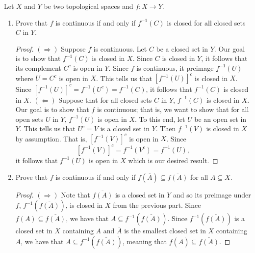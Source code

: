 \documentclass[a4paper]{article}
\begin{document}
\rhead{\thepage}
\begin{problem}
   Let \( X  \) and \( Y  \) be two topological spaces and \( f : X \to Y  \). 
   \begin{enumerate}
       \item[(i)] Prove that \( f  \) is continuous if and only if \( f^{-1}(C)  \) is closed for all closed sets \( C  \) in \( Y  \).
           \begin{proof}
               \( (\Longrightarrow) \) Suppose \( f  \) is continuous. Let \( C  \) be a closed set in \( Y  \). Our goal is to show that \( f^{-1}(C)  \) is closed in \( X  \). Since \( C  \) is closed in \( Y  \), it follows that its complement \( C^{c} \) is open in \( Y  \). Since \( f \) is continuous, it preimage \( f^{-1}(U) \) where \( U = C^{c} \) is open in \( X  \). This tells us that \( [f^{-1}(U)]^{c} \) is closed in \( X  \). Since \( [f^{-1}(U)]^{c} = f^{-1}(U^{c})  = f^{-1}(C) \), it follows that \( f^{-1}(C) \) is closed in \( X  \). 
\( (\Longleftarrow) \) Suppose that for all closed sets \( C  \) in \( Y  \), \( f^{-1}(C) \) is closed in \( X  \). Our goal is to show that \( f \) is continuous; that is, we want to show that for all open sets \( U  \) in \( Y  \), \( f^{-1}(U) \) is open in \( X  \). To this end, let \( U  \) be an open set in \( Y  \). This tells us that \( U^{c} = V  \) is a closed set in \( Y  \). Then \( f^{-1}(V) \) is closed in \( X  \) by assumption. That is, \( [f^{-1}(V)]^{c} \) is open in \( X  \). Since 
               \[  [f^{-1}(V)]^{c} = f^{-1}(V^{c}) = f^{-1}(U), \]
               it follows that \( f^{-1}(U) \) is open in \( X  \) which is our desired result.
           \end{proof}
       \item[(ii)] Prove that \( f  \) is continuous if and only if \( f(\overline{A})  \subseteq \overline{f(A)}   \) for all \( A \subseteq  X  \).
           \begin{proof}
               \( (\Longrightarrow) \)
               Note that \( \overline{f(A)} \) is a closed set in \( Y  \) and so its preimage under \( f  \), \( f^{-1}(\overline{f(A)}) \), is closed in \( X  \) from the previous part. Since \( f(A) \subseteq \overline{f(A)} \), we have that \( A \subseteq f^{-1}(\overline{f(A)}) \). Since \( f^{-1}(\overline{f(A)})\) is a closed set in \( X  \) containing \( A  \) and \( \overline{A} \) is the smallest closed set in \( X  \) containing \( A  \), we have that \( \overline{A} \subseteq f^{-1}(\overline{f(A)}) \), meaning that \( f(\overline{A}) \subseteq  \overline{f(A)} \).


\end{proof}
\end{enumerate}
\end{problem}
\end{document}
